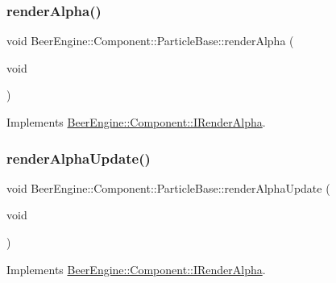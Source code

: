 \subsubsection{\texorpdfstring{render\+Alpha()}{renderAlpha()}}
{\footnotesize\ttfamily void Beer\+Engine\+::\+Component\+::\+Particle\+Base\+::render\+Alpha (\begin{DoxyParamCaption}\item[{void}]{ }\end{DoxyParamCaption})\hspace{0.3cm}{\ttfamily [virtual]}}



Implements \mbox{\hyperlink{class_beer_engine_1_1_component_1_1_i_render_alpha_a3797df36149a8a8416ef24406923f068}{Beer\+Engine\+::\+Component\+::\+I\+Render\+Alpha}}.

\mbox{\label{class_beer_engine_1_1_component_1_1_particle_base_a0cecaefb92ed219eb0ddc2771c513446}} 
\subsubsection{\texorpdfstring{render\+Alpha\+Update()}{renderAlphaUpdate()}}
{\footnotesize\ttfamily void Beer\+Engine\+::\+Component\+::\+Particle\+Base\+::render\+Alpha\+Update (\begin{DoxyParamCaption}\item[{void}]{ }\end{DoxyParamCaption})\hspace{0.3cm}{\ttfamily [virtual]}}



Implements \mbox{\hyperlink{class_beer_engine_1_1_component_1_1_i_render_alpha_ad0fd47a02cc63152b25dbfdb4b2639fa}{Beer\+Engine\+::\+Component\+::\+I\+Render\+Alpha}}.

\mbox{\label{class_beer_engine_1_1_component_1_1_particle_base_ac4ab484a5ef468cbb69cccdf39e6d9a8}} 
